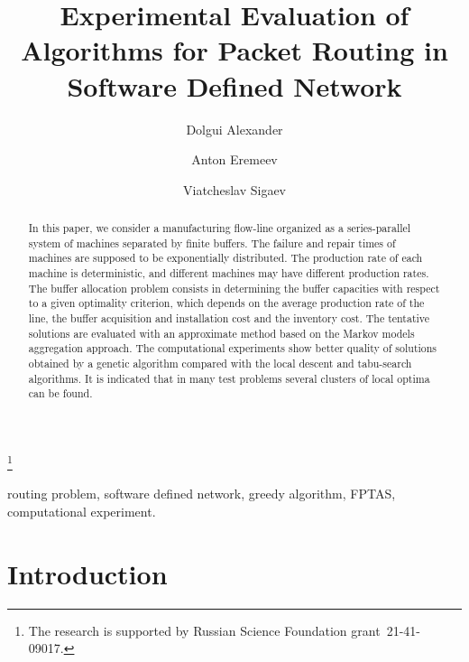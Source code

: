 \documentclass{ifacconf}
\begin{document}
\begin{frontmatter}

\title{Experimental Evaluation of Algorithms for Packet Routing in Software Defined Network} 

\thanks[footnoteinfo]{The research is supported by Russian Science Foundation  grant~21-41-09017.}

\author[First]{Dolgui Alexander} 
\author[Second]{Anton Eremeev} 
\author[Third]{Viatcheslav Sigaev}

\address[First]{Sobolev Institute of Mathematics SB RAS, Novosibirsk, Russia 
(e-mail: eremeev@ofim.oscsbras.ru).}
\address[Second]{Yaliny Research and Development Center,  Moscow, Russia }
\address[Third]{Yaliny Research and Development Center,  Moscow, Russia }


\begin{abstract}                %
In this paper, we consider a manufacturing flow-line
organized as a series-parallel system of machines separated by
finite buffers. The failure and repair times of machines are
supposed to be exponentially distributed. The production rate of
each machine is deterministic, and different machines may have
different production rates. The buffer allocation problem consists
in determining the buffer capacities with respect to a given
optimality criterion, which depends on the average production rate
of the line, the buffer acquisition and installation cost and the
inventory cost. The tentative solutions are evaluated with an
approximate method based on the Markov models aggregation
approach. The computational experiments show better quality of
solutions obtained by a genetic algorithm compared with the local
descent and tabu-search algorithms. It is indicated that in many
test problems several clusters of local optima can be found.
\end{abstract}

\begin{keyword}
routing problem, software defined network, greedy algorithm, FPTAS, computational experiment.
\end{keyword}

\end{frontmatter}

\section{Introduction}
\end{document}
